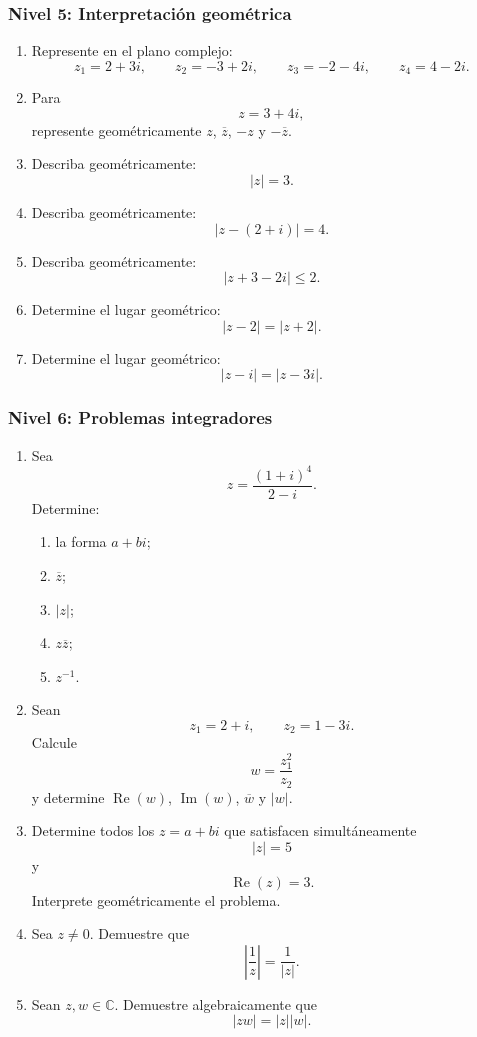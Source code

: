 \subsubsection*{Nivel 5: Interpretación geométrica}

\begin{enumerate}

\item Represente en el plano complejo:
\[
z_1=2+3i,\qquad
z_2=-3+2i,\qquad
z_3=-2-4i,\qquad
z_4=4-2i.
\]

\item Para
\[
z=3+4i,
\]
represente geométricamente $z$, $\overline z$, $-z$ y $-\overline z$.

\item Describa geométricamente:
\[
|z|=3.
\]

\item Describa geométricamente:
\[
|z-(2+i)|=4.
\]

\item Describa geométricamente:
\[
|z+3-2i|\leq 2.
\]

\item Determine el lugar geométrico:
\[
|z-2|=|z+2|.
\]

\item Determine el lugar geométrico:
\[
|z-i|=|z-3i|.
\]

\end{enumerate}


\subsubsection*{Nivel 6: Problemas integradores}

\begin{enumerate}

\item Sea
\[
z=\frac{(1+i)^4}{2-i}.
\]
Determine:

\begin{enumerate}
    \item la forma $a+bi$;
    \item $\overline z$;
    \item $|z|$;
    \item $z\overline z$;
    \item $z^{-1}$.
\end{enumerate}

\item Sean
\[
z_1=2+i,
\qquad
z_2=1-3i.
\]
Calcule
\[
w=\frac{z_1^2}{z_2}
\]
y determine $\operatorname{Re}(w)$, $\operatorname{Im}(w)$,
$\overline w$ y $|w|$.

\item Determine todos los $z=a+bi$ que satisfacen simultáneamente
\[
|z|=5
\]
y
\[
\operatorname{Re}(z)=3.
\]
Interprete geométricamente el problema.

\item Sea $z\neq0$. Demuestre que
\[
\left|\frac{1}{z}\right|=\frac{1}{|z|}.
\]

\item Sean $z,w\in\mathbb{C}$. Demuestre algebraicamente que
\[
|zw|=|z||w|.
\]

\end{enumerate}